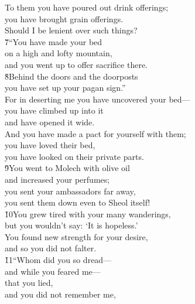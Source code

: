 \begin{poetry}
\poeml To them you have poured out drink offerings; \\
\poemll    you have brought grain offerings. \\
\poemlll       Should I be lenient over such things? \\
\poeml \v{7}``You have made your bed \\
\poemll    on a high and lofty mountain, \\
\poemlll       and you went up to offer sacrifice there. \\
\poeml \v{8}Behind the doors and the doorposts \\
\poemll    you have set up your pagan sign.'' \\
\poeml For in deserting me you have uncovered your bed--- \\
\poemll    you have climbed up into it \\
\poemlll       and have opened it wide. \\
\poeml And you have made a pact for yourself with them; \\
\poemll    you have loved their bed, \\
\poemlll       you have looked on their private parts. \\
\poeml \v{9}You went to Molech with olive oil \\
\poemll    and increased your perfumes; \\
\poeml you sent your ambassadors far away, \\
\poemll    you sent them down even to Sheol itself! \\
\poeml \v{10}You grew tired with your many wanderings, \\
\poemll    but you wouldn't say: `It is hopeless.' \\
\poeml You found new strength for your desire, \\
\poemll    and so you did not falter. \\
\poeml \v{11}``Whom did you so dread--- \\
\poemll    and while you feared me--- \\
\poeml that you lied, \\
\poemll    and you did not remember me, \\

\end{poetry}
